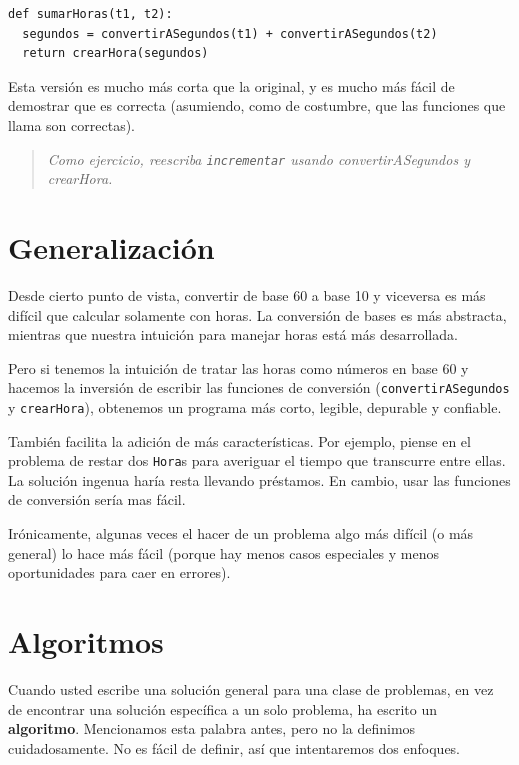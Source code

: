 \beforeverb
\begin{verbatim}
def sumarHoras(t1, t2):
  segundos = convertirASegundos(t1) + convertirASegundos(t2)
  return crearHora(segundos)
\end{verbatim}
\afterverb
%
Esta versión es mucho más corta que la original, y es mucho
más fácil de demostrar que es correcta (asumiendo, como de 
costumbre, que las funciones que llama son correctas).

\begin{quote}
{\em Como ejercicio, reescriba \texttt{incrementar} usando 
convertirASegundos y crearHora.}
\end{quote}


\section{Generalización}

Desde cierto punto de vista, convertir de base 60
a base 10 y viceversa es más difícil que calcular
solamente con horas. La conversión de bases es más
abstracta, mientras que nuestra intuición para 
manejar horas está más desarrollada.

Pero si tenemos la intuición de tratar las horas como
números en base 60 y hacemos la inversión de escribir
las funciones de conversión  ({\tt convertirASegundos} y 
\texttt{crearHora}), obtenemos un programa más corto,
legible, depurable y confiable.

También facilita la adición de más características. Por
ejemplo, piense en el problema de restar dos  \texttt{Hora}s para
averiguar el tiempo que transcurre entre ellas.  La solución
ingenua haría resta llevando préstamos. En cambio, usar las
funciones de conversión sería mas fácil.

Irónicamente, algunas veces el hacer de un problema algo
más difícil (o más general) lo hace más fácil (porque
hay menos casos especiales y menos oportunidades para
caer en errores).


\section{Algoritmos}

Cuando usted escribe una solución general para una clase de problemas,
en vez de encontrar una solución específica a un solo problema, ha
escrito un  {\bf algoritmo}. Mencionamos esta palabra antes, pero no 
la definimos cuidadosamente. No es fácil de definir, así que intentaremos
dos enfoques.

